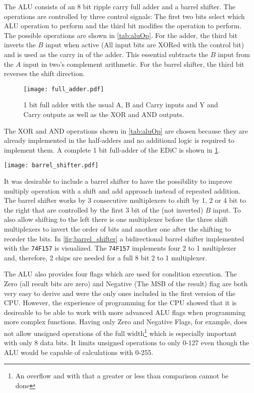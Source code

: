 The \gls{ALU} consists of an 8 bit ripple carry full adder and a barrel shifter.
The operations are controlled by three control signals: The first two bits select which \gls{ALU} operation to perform and the third bit modifies the operation to perform.
The possible operations are shown in \cref{tab:aluOp}.
For the adder, the third bit inverts the $B$ input when active (All input bits are XORed with the control bit) and is used as the carry in of the adder.
This essential subtracts the $B$ input from the $A$ input in two's complement arithmetic.
For the barrel shifter, the third bit reverses the shift direction.
\begin{figure}[t]
  \centering
  \texttt{[image: full\_adder.pdf]}
  \caption{1 bit full adder with the usual A, B and Carry inputs and Y and Carry outputs as well as the XOR and AND outputs.}
  \label{fig:full_adder}
\end{figure}
The XOR and AND operations shown in \cref{tab:aluOp} are chosen because they are already implemented in the half-adders and no additional logic is required to implement them.
A complete 1 bit full-adder of the \gls{EDiC} is shown in \cref{fig:full_adder}.

\begin{sidewaysfigure}[p]
  \centering
  \texttt{[image: barrel\_shifter.pdf]}
  \caption{8 bit bidirectional barrel shifter.}
  \label{fig:barrel_shifter}
\end{sidewaysfigure}
It was desirable to include a barrel shifter to have the possibility to improve multiply operation with a shift and add approach instead of repeated addition.
The barrel shifter works by 3 consecutive multiplexers to shift by 1, 2 or 4 bit to the right that are controlled by the first 3 bit of the (not inverted) $B$ input.
To also allow shifting to the left there is one multiplexer before the three shift multiplexers to invert the order of bits and another one after the shifting to reorder the bits.
In \cref{fig:barrel_shifter} a bidirectional barrel shifter implemented with the \texttt{74F157} is visualized. The \texttt{74F157} implements four 2 to 1 multiplexer and, therefore, 2 chips are needed for a full 8 bit 2 to 1 multiplexer.

The \gls{ALU} also provides four flags which are used for condition execution.
The Zero (all result bits are zero) and Negative (The \gls{MSB} of the result) flag are both very easy to derive and were the only ones included in the first version of the \gls{CPU}.
However, the experience of programming for the \gls{CPU} showed that it is desireable to be able to work with more advanced \gls{ALU} flags when programming more complex functions.
Having only Zero and Negative Flags, for example, does not allow unsigned operations of the full width\footnote{An overflow and with that a greater or less than comparison cannot be done} which is especially important with only 8 data bits.
It limits unsigned operations to only 0-127 even though the \gls{ALU} would be capable of calculations with 0-255.

